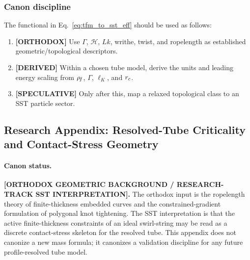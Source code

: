\subsubsection{Canon discipline}
The functional in Eq.~\eqref{eq:tfm_to_sst_eff} should be used as follows:
\begin{enumerate}
    \item \textbf{[ORTHODOX]} Use $\Gamma$, $\mathcal H$, $Lk$, writhe, twist, and ropelength as established geometric/topological descriptors.
    \item \textbf{[DERIVED]} Within a chosen tube model, derive the units and leading energy scaling from $\rho_{\!f}$, $\Gamma$, $\ell_K$, and $r_c$.
    \item \textbf{[SPECULATIVE]} Only after this, map a relaxed topological class to an SST particle sector.
\end{enumerate}

\subsection{Research Appendix: Resolved-Tube Criticality and Contact-Stress Geometry}
\label{app:resolved_tube_contact_stress_geometry}

\paragraph{Canon status.}
\textbf{[ORTHODOX GEOMETRIC BACKGROUND / RESEARCH-TRACK SST INTERPRETATION].}
The orthodox input is the ropelength theory of finite-thickness embedded
curves and the constrained-gradient formulation of polygonal knot tightening.
The SST interpretation is that the active finite-thickness constraints of an
ideal swirl-string may be read as a discrete contact-stress skeleton for the
resolved tube.  This appendix does not canonize a new mass formula; it
canonizes a validation discipline for any future profile-resolved tube model.

